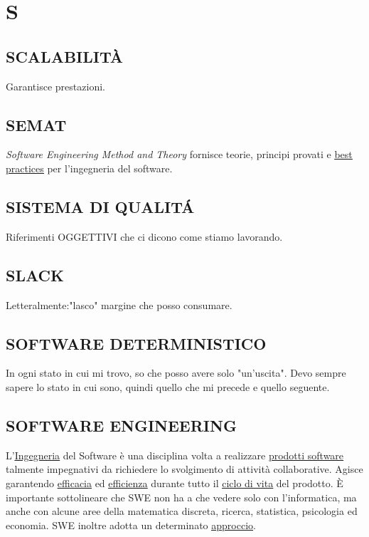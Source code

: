 \newpage
	\section{S} \label{sec:S}

		\subsection{SCALABILITÀ}  \label{scalabitlita}
		Garantisce prestazioni.

		\subsection{SEMAT}  \label{semat}
			\textit{Software Engineering Method and Theory} fornisce teorie, principi provati e \underline{\hyperref[best]{best practices}} per l'ingegneria del software.

		\subsection{SISTEMA DI QUALITÁ}  \label{sistemadiqualita}
		Riferimenti OGGETTIVI che ci dicono come stiamo lavorando.

		\subsection{SLACK}  \label{slack}
		Letteralmente:"lasco" margine che posso consumare.

		\subsection{SOFTWARE DETERMINISTICO}  \label{softwaredeterministico}
		In ogni stato in cui mi trovo, so che posso avere solo "un'uscita". Devo sempre sapere lo stato in cui sono, quindi quello che mi precede e quello seguente.


		\subsection{SOFTWARE ENGINEERING}  \label{swe}
	     L'\underline{\hyperref[engineering]{Ingegneria}} del Software è una disciplina volta a realizzare  \underline{\hyperref[prodotto]{prodotti software}} talmente impegnativi da richiedere lo svolgimento di attività collaborative. Agisce garantendo \underline{\hyperref[efficacia]{efficacia}} ed \underline{\hyperref[efficienza]{efficienza}} durante tutto il \underline{\hyperref[ciclo]{ciclo di vita}} del prodotto. È importante sottolineare che SWE non ha a che vedere solo con l'informatica, ma anche con alcune aree della matematica discreta, ricerca, statistica, psicologia ed economia. SWE inoltre adotta un determinato \underline{\hyperref[approccio]{approccio}}.

